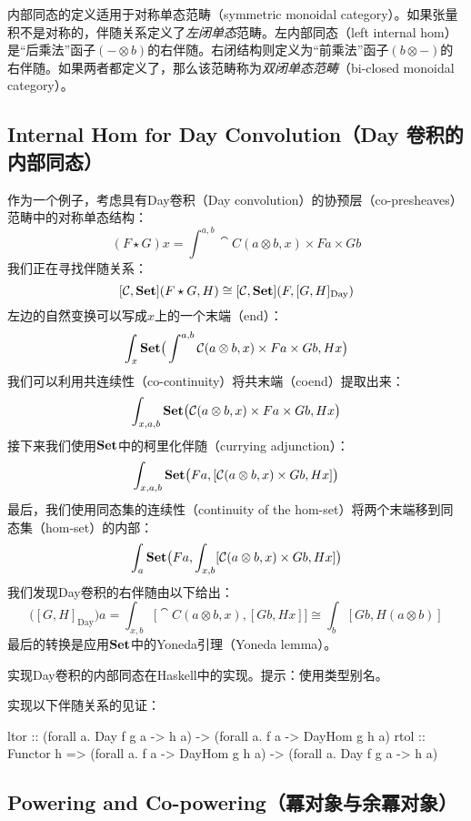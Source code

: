 \documentclass[DaoFP]{subfiles}
\begin{document}
 内部同态的定义适用于对称单态范畴（symmetric monoidal category）。如果张量积不是对称的，伴随关系定义了\emph{左闭单态}范畴。左内部同态（left internal hom）是“后乘法”函子$(- \otimes b)$的右伴随。右闭结构则定义为“前乘法”函子$(b \otimes -)$的右伴随。如果两者都定义了，那么该范畴称为\emph{双闭单态范畴}（bi-closed monoidal category）。

 \subsection{Internal Hom for Day Convolution（Day 卷积的内部同态）}

 作为一个例子，考虑具有Day卷积（Day convolution）的协预层（co-presheaves）范畴中的对称单态结构：
 \[ (F \star G) x = \int^{a, b} \cat C (a \otimes b, x) \times F a \times G b \]
 我们正在寻找伴随关系：
 \[ [\mathcal{C}, \mathbf{Set}] (F \star G, H) \cong  [\mathcal{C}, \mathbf{Set}] (F, [G, H]_{\text{Day}}) \]
 左边的自然变换可以写成$x$上的一个末端（end）：
 \[ \int_x \mathbf{Set} \big( \int^{a, b} \mathcal{C} (a \otimes b, x) \times F a \times G b, H x \big) \]
 我们可以利用共连续性（co-continuity）将共末端（coend）提取出来：
 \[ \int_{x, a, b} \mathbf{Set} \big( \mathcal{C} (a \otimes b, x) \times F a \times G b, H x \big) \]
 接下来我们使用$\mathbf{Set}$中的柯里化伴随（currying adjunction）：
 \[ \int_{x, a, b} \mathbf{Set} \big( F a, [\mathcal{C} (a \otimes b, x)  \times G b, H x] \big) \]
 最后，我们使用同态集的连续性（continuity of the hom-set）将两个末端移到同态集（hom-set）的内部：
 \[ \int_{a} \mathbf{Set} \big( F a, \int_{x, b} [\mathcal{C} (a \otimes b, x)  \times G b, H x] \big) \]
 我们发现Day卷积的右伴随由以下给出：
 \[ \big([G, H]_{\text{Day}}\big) a = \int_{x, b} \big[\cat C(a \otimes b, x), [G b, H x]\big] \cong \int_b [G b, H (a \otimes b)] \]
 最后的转换是应用$\mathbf{Set}$中的Yoneda引理（Yoneda lemma）。

 \begin{exercise}
  实现Day卷积的内部同态在Haskell中的实现。提示：使用类型别名。
 \end{exercise}

 \begin{exercise}
  实现以下伴随关系的见证：
  \begin{haskell}
   ltor :: (forall a. Day f g a -> h a) -> (forall a. f a -> DayHom g h a)
   rtol :: Functor h =>
   (forall a. f a -> DayHom g h a) -> (forall a. Day f g a -> h a)
  \end{haskell}
 \end{exercise}

 \subsection{Powering and Co-powering（冪对象与余冪对象）}
\end{document}
